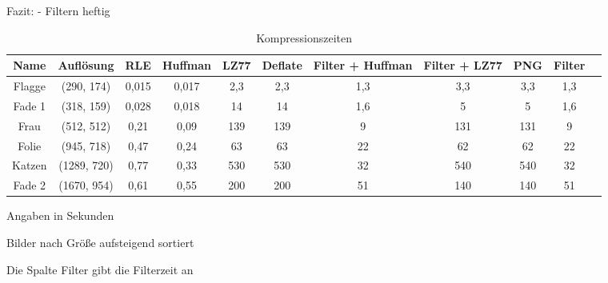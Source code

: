 \documentclass[conference]{IEEEtran}
\begin{document}
Fazit:
- Filtern heftig


\begin{table}
  \renewcommand*{\arraystretch}{1.1}
  \centering
  \begin{threeparttable}
    \caption{Kompressionszeiten}
    \begin{tabular}{c *9{c} S[table-format=5.9]}
      \toprule
      Name   & Auflösung   & RLE   & Huffman & LZ77 & Deflate & Filter + Huffman & Filter + LZ77 & PNG & Filter \\
      \midrule
      Flagge & (290, 174)  & 0,015 & 0,017   & 2,3  & 2,3     & 1,3              & 3,3           & 3,3 & 1,3    \\
      Fade 1 & (318, 159)  & 0,028 & 0,018   & 14   & 14      & 1,6              & 5             & 5   & 1,6    \\
      Frau   & (512, 512)  & 0,21  & 0,09    & 139  & 139     & 9                & 131           & 131 & 9      \\
      Folie  & (945, 718)  & 0,47  & 0,24    & 63   & 63      & 22               & 62            & 62  & 22     \\
      Katzen & (1289, 720) & 0,77  & 0,33    & 530  & 530     & 32               & 540           & 540 & 32     \\
      Fade 2 & (1670, 954) & 0,61  & 0,55    & 200  & 200     & 51               & 140           & 140 & 51
    \end{tabular}
    \par{} Angaben in Sekunden
    \par{} Bilder nach Größe aufsteigend sortiert
    \par{} Die Spalte Filter gibt die Filterzeit an
    \label{tab:kompzeiten}
  \end{threeparttable}
\end{table}
\end{document}
